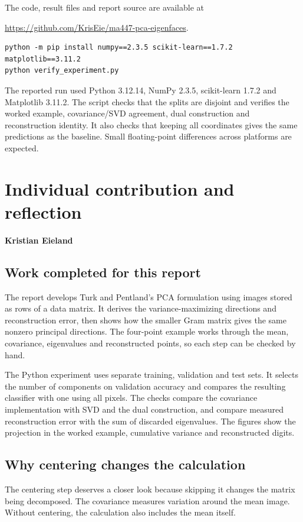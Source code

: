 \documentclass[11pt,a4paper,english]{article}
\numberwithin{equation}{section}
\begin{document}
The code, result files and report source are available at\par
\url{https://github.com/KrisEie/ma447-pca-eigenfaces}.

\begin{lstlisting}
python -m pip install numpy==2.3.5 scikit-learn==1.7.2 matplotlib==3.11.2
python verify_experiment.py
\end{lstlisting}
The reported run used Python 3.12.14, NumPy 2.3.5, scikit-learn 1.7.2 and Matplotlib 3.11.2. The script checks that the splits are disjoint and verifies the worked example, covariance/SVD agreement, dual construction and reconstruction identity. It also checks that keeping all coordinates gives the same predictions as the baseline. Small floating-point differences across platforms are expected.
\clearpage
\section{Individual contribution and reflection}
\label{sec:individual}
\textbf{Kristian Eieland}

\subsection{Work completed for this report}
The report develops Turk and Pentland's PCA formulation using images stored as rows of a data matrix. It derives the variance-maximizing directions and reconstruction error, then shows how the smaller Gram matrix gives the same nonzero principal directions. The four-point example works through the mean, covariance, eigenvalues and reconstructed points, so each step can be checked by hand.

The Python experiment uses separate training, validation and test sets. It selects the number of components on validation accuracy and compares the resulting classifier with one using all pixels. The checks compare the covariance implementation with SVD and the dual construction, and compare measured reconstruction error with the sum of discarded eigenvalues. The figures show the projection in the worked example, cumulative variance and reconstructed digits.

\subsection{Why centering changes the calculation}
The centering step deserves a closer look because skipping it changes the matrix being decomposed. The covariance measures variation around the mean image. Without centering, the calculation also includes the mean itself.
\end{document}
